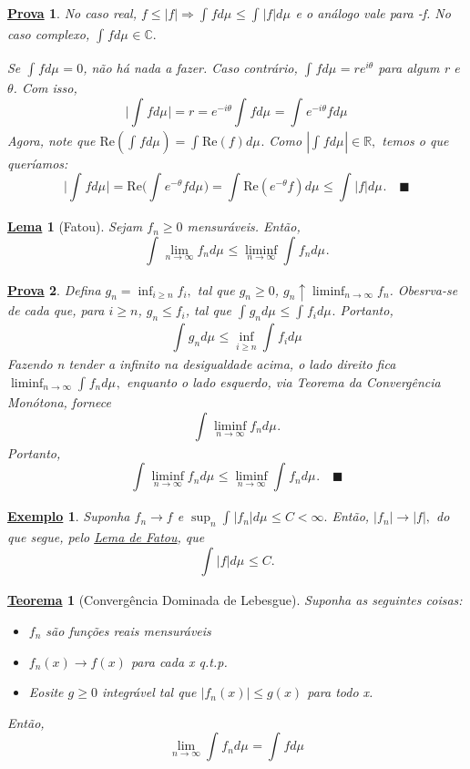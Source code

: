 \documentclass{article}
\newtheorem*{theorem*}{\underline{Teorema}}
\newtheorem*{lemma*}{\underline{Lema}}
\newtheorem{example}{\underline{Exemplo}}
\newtheorem*{proof*}{\underline{Prova}}
\renewcommand\qedsymbol{$\blacksquare$}
\begin{document}
\begin{proof*}
  No caso real, \(f \leq |f| \Rightarrow \int_{}f d\mu_{} \leq \int_{}|f| d\mu_{}\) e o análogo vale para -f. No caso complexo, \(\int_{}f d\mu_{}\in \mathbb{C}.\)

  Se \(\int_{}f d\mu_{} = 0\), não há nada a fazer. Caso contrário, \(\int_{}f d\mu_{} = re^{i\theta }\) para algum r e \(\theta \). Com isso, 
    \[
      \biggl\vert \int_{}f d\mu_{} \biggr\vert = r = e^{-i\theta }\int_{}f d\mu_{} = \int_{}e^{-i\theta }f d\mu_{}
    \]
  Agora, note que \(\mathrm{Re}(\int_{}f d\mu_{}) = \int_{}\mathrm{Re}(f) d\mu_{}.\) Como \(|\int_{}f d\mu_{}|\in \mathbb{R},\) temos o que queríamos: 
    \[
      \biggl\vert \int_{}f d\mu_{}  \biggr\vert = \mathrm{Re}\biggl(\int_{}e^{-\theta }f d\mu_{}\biggr) = \int_{}\mathrm{Re}(e^{-\theta }f) d\mu_{} \leq \int_{}|f| d\mu_{}.\quad \text{\qedsymbol}
    \]
\end{proof*}
\hypertarget{fatou}{ 
  \begin{lemma*}[Fatou]
 Sejam \(f_{n}\geq 0\) mensuráveis. Então, 
   \[
     \int_{}\lim_{n\to \infty}f_{n} d\mu_{} \leq \liminf_{n\to \infty}\int_{}f_{n} d\mu_{}.
   \]
\end{lemma*}}
\begin{proof*}
  Defina \(g_{n} = \inf_{i\geq n}f_{i},\) tal que \(g_{n}\geq 0\),  \(g_{n}\uparrow \liminf_{n\to \infty}f_{n}\). Obesrva-se de cada que, para \(i\geq n\), 
  \(g_{n}\leq f_{i}\), tal que \(\int_{}g_{n} d\mu_{} \leq \int_{}f_{i} d\mu_{}.\) Portanto, 
    \[
      \int_{}g_{n} d\mu_{} \leq \inf_{i\geq n} \int_{}f_{i} d\mu_{}
    \]
  Fazendo n tender a infinito na desigualdade acima, o lado direito fica \(\liminf_{n\to \infty}\int_{}f_{n} d\mu_{},\) enquanto o lado esquerdo, via Teorema da Convergência Monótona, fornece 
    \[
      \int_{}\liminf_{n\to \infty}f_{n} d\mu_{}.
    \]
  Portanto, 
    \[
      \int_{}\liminf_{n\to \infty}f_{n} d\mu_{} \leq \liminf_{n\to \infty}\int_{}f_{n} d\mu_{}.\quad \text{\qedsymbol}
    \]
\end{proof*}
\begin{example}
  Suponha \(f_{n}\longrightarrow f\) e \(\sup_{n}\int_{}|f_{n}| d\mu_{} \leq C < \infty.\) Então, \(|f_{n}|\to |f|,\) do que segue, pelo \hyperlink{fatou}{\textit{Lema de Fatou}}, que 
    \[
      \int_{}|f| d\mu_{} \leq C.
    \]
\end{example}
 \hypertarget{dominated_convergence}{
   \begin{theorem*}[Convergência Dominada de Lebesgue]
   Suponha as seguintes coisas: 
  \begin{itemize}
    \item \(f_{n}\) são funções reais mensuráveis 
    \item \(f_{n}(x)\to f(x)\) para cada x q.t.p.
    \item Eosite \(g\geq 0\) integrável tal que \(|f_{n}(x)| \leq g(x)\) para todo x.
  \end{itemize}
  Então, 
    \[
      \lim_{n\to \infty}\int_{}f_{n} d\mu_{} = \int_{}f d\mu_{}
    \]
 \end{theorem*}}
\end{document}
